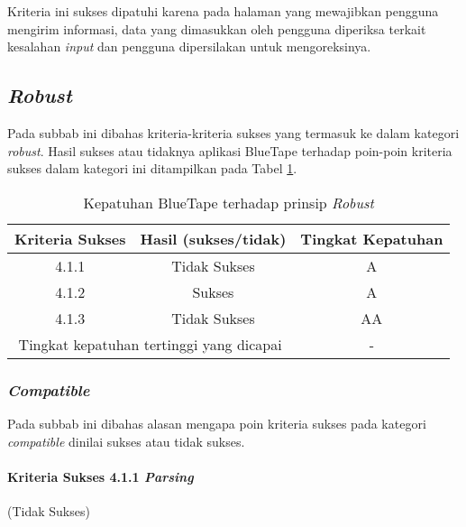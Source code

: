 Kriteria ini sukses dipatuhi karena pada halaman yang mewajibkan pengguna mengirim informasi, data yang dimasukkan oleh pengguna diperiksa terkait kesalahan \textit{input} dan pengguna dipersilakan untuk mengoreksinya.

\subsection{\textit{Robust}}
\label{subsec:kepatuhan_bluetape_robust}
Pada subbab ini dibahas kriteria-kriteria sukses yang termasuk ke dalam kategori \textit{robust}. Hasil sukses atau tidaknya aplikasi BlueTape terhadap poin-poin kriteria sukses dalam kategori ini ditampilkan pada Tabel \ref{tab:kepatuhan_bluetape_robust}.

\begin{table}[H]
    \centering 
    \caption{Kepatuhan BlueTape terhadap prinsip \textit{Robust}}
    \label{tab:kepatuhan_bluetape_robust}
    \begin{tabular}{|c|c|c|}
        \toprule
        Kriteria Sukses & Hasil (sukses/tidak) & Tingkat Kepatuhan\\

        \midrule
        \rowcolor{darkred} 4.1.1 & Tidak Sukses & A \\
        4.1.2 & Sukses & A \\
        \rowcolor{brightred} 4.1.3 & Tidak Sukses & AA \\

        \bottomrule
        \multicolumn{2}{|c|}{Tingkat kepatuhan tertinggi yang dicapai} & - \\
        \bottomrule

    \end{tabular} 
\end{table}

\subsubsection{\textit{Compatible}}
\label{subsubsec:kepatuhan_bluetape_compatible}
Pada subbab ini dibahas alasan mengapa poin kriteria sukses pada kategori \textit{compatible} dinilai sukses atau tidak sukses.

\paragraph{Kriteria Sukses 4.1.1 \textit{Parsing}}
\label{par:kepatuhan_bluetape_kriteria_sukses_4.1.1}
(Tidak Sukses)\\

